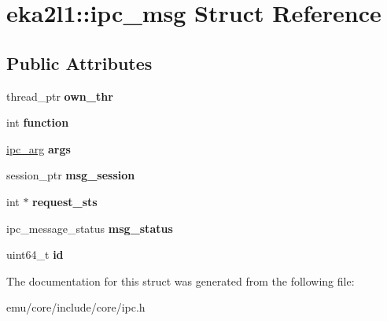 \hypertarget{structeka2l1_1_1ipc__msg}{}\section{eka2l1\+:\+:ipc\+\_\+msg Struct Reference}
\label{structeka2l1_1_1ipc__msg}
\subsection*{Public Attributes}
\begin{DoxyCompactItemize}
\item 
\mbox{\label{structeka2l1_1_1ipc__msg_a61ffc8a6adccb763dba9ff53b799b8e2}} 
thread\+\_\+ptr {\bfseries own\+\_\+thr}
\item 
\mbox{\label{structeka2l1_1_1ipc__msg_a1179c40c02a4b64ba7cabea6d1f91fff}} 
int {\bfseries function}
\item 
\mbox{\label{structeka2l1_1_1ipc__msg_af5a6bb1fcbc12cb38d1e5ee706d3ff3c}} 
\mbox{\hyperlink{structeka2l1_1_1ipc__arg}{ipc\+\_\+arg}} {\bfseries args}
\item 
\mbox{\label{structeka2l1_1_1ipc__msg_a5fcaadbedef974d32d7c24a92637b5a2}} 
session\+\_\+ptr {\bfseries msg\+\_\+session}
\item 
\mbox{\label{structeka2l1_1_1ipc__msg_a3d610f2fc8acb08a2ac2ddef1b99a47e}} 
int $\ast$ {\bfseries request\+\_\+sts}
\item 
\mbox{\label{structeka2l1_1_1ipc__msg_a70edb416c2155fc75476806145d578c6}} 
ipc\+\_\+message\+\_\+status {\bfseries msg\+\_\+status}
\item 
\mbox{\label{structeka2l1_1_1ipc__msg_a22df7746d986888cbdf1e7690e64680b}} 
uint64\+\_\+t {\bfseries id}
\end{DoxyCompactItemize}


The documentation for this struct was generated from the following file\+:\begin{DoxyCompactItemize}
\item 
emu/core/include/core/ipc.\+h\end{DoxyCompactItemize}

